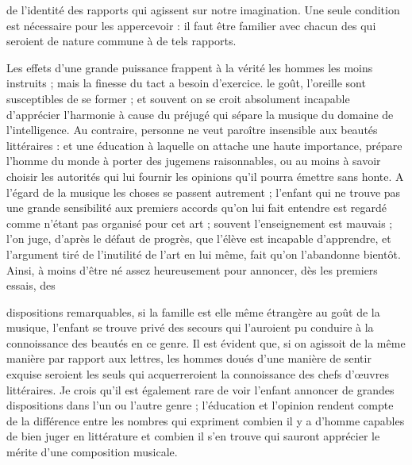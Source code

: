 \documentclass[11pt,a4paper]{article}
\begin{document}
de l'identité des rapports qui agissent sur notre imagination. Une seule
condition est nécessaire pour les appercevoir : il faut être familier
avec chacun des  qui seroient de nature commune à de
tels rapports.

 Les effets d'une grande puissance frappent à la vérité les
hommes les moins instruits ; mais la finesse du tact a besoin
d'exercice. le goût, l'oreille sont susceptibles de se former ; et
souvent on se croit absolument incapable d'apprécier 
l'harmonie  à cause du préjugé qui sépare la musique du
domaine de l'intelligence. Au contraire, personne ne veut paroître
insensible aux beautés littéraires : et une éducation à laquelle on
attache une  haute importance, prépare l'homme du monde à
porter des jugemens raisonnables, ou au moins à savoir choisir les
autorités qui   lui fournir les
opinions qu'il pourra émettre sans honte. A l'égard de la musique les
choses se passent autrement ; l'enfant qui ne  trouve
pas une grande sensibilité aux  premiers accords qu'on lui
fait entendre est regardé comme n'étant pas organisé pour cet art ;
souvent l'enseignement est  mauvais ;  l'on
juge, d'après le défaut de progrès, que l'élève est incapable
d'apprendre, et  l'argument tiré de l'inutilité de l'art en
lui même, fait \struck{\ill{}} qu'on l'abandonne bientôt. Ainsi, à moins
d'être né assez heureusement pour annoncer, dès les premiers essais,
des

dispositions remarquables, si la famille est elle même étrangère au goût
de la musique,  l'enfant se trouve privé des secours qui
l'auroient pu conduire à la connoissance des beautés en ce genre. Il est
évident que, si on agissoit de la même manière par rapport aux lettres,
les hommes doués d'une manière de sentir  exquise seroient les
seuls qui  acquerreroient la connoissance des chefs
d'œuvres littéraires. Je crois qu'il est également rare de voir l'enfant
annoncer de grandes dispositions dans l'un ou l'autre genre ;
l'éducation et l'opinion rendent compte de la différence entre les
nombres qui expriment combien il y a d'homme capables de bien juger en
littérature et combien il s'en trouve qui sauront apprécier le mérite
d'une composition musicale. 
\end{document}
